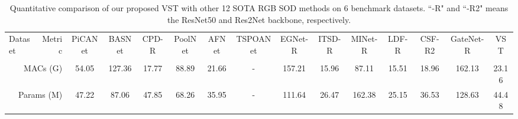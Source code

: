 \documentclass[10pt,twocolumn,letterpaper]{article}
\begin{document}
\begin{table*}[t]
  \centering
\footnotesize
\renewcommand{\arraystretch}{1.0}
\renewcommand{\tabcolsep}{1mm}
\caption{Quantitative comparison of our proposed VST with other 12 SOTA RGB SOD methods on 6 benchmark datasets. ``-R" and ``-R2" means the ResNet50 and Res2Net backbone, respectively.}
\begin{tabular}{lr|cccccccccccc|c}
  \hline

    Dataset
    & Metric
    & PiCANet & BASNet & CPD-R & PoolNet  & AFNet & TSPOANet & EGNet-R & ITSD-R & MINet-R & LDF-R & CSF-R2 & GateNet-R & VST\\
    &
    & \cite{liu2018picanet} &\cite{Qin19BASNet} & \cite{Wu_CPD}   & \cite{Liu19PoolNet} & \cite{Feng_AFNet}& \cite{Liu_TSPOANet} & \cite{zhao2019EGNet} & \cite{Zhou2020ITSD} & \cite{MINet-CVPR2020} &\cite{CVPR2020_LDF} & \cite{gao2020sod100k} &\cite{GateNet}\\ \hline

   \multicolumn{2}{r|}{MACs (G)}  &54.05 &127.36 &17.77 &88.89	&21.66	&-	&157.21	&15.96 &87.11 &15.51 &18.96	&162.13	&23.16\\
   \multicolumn{2}{r|}{Params (M)}  &47.22	&87.06 &47.85 &68.26 &35.95	&- &111.64 &26.47 &162.38 &25.15 &36.53	&128.63	&44.48\\
     \hline
     

\end{tabular}
\end{table*}
\end{document}
